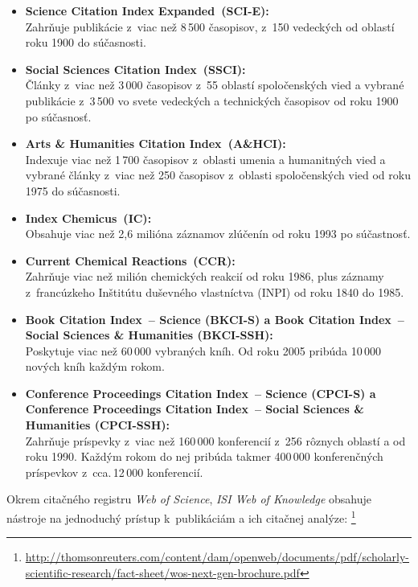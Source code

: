 \begin{itemize}
\item \textbf{Science Citation Index Expanded\R\ (SCI-E):}\\
  Zahrňuje publikácie z~viac než 8\,500 časopisov, z~150
  vedeckých od oblastí roku 1900 do súčasnosti.
\item \textbf{Social Sciences Citation Index\R\ (SSCI):}\\
  Články z~viac než 3\,000 časopisov z~55 oblastí spoločenských vied a vybrané
  publikácie z~3\,500 vo svete vedeckých a technických
  časopisov od roku 1900 po súčasnosť.
\item \textbf{Arts \& Humanities Citation Index\R\ (A\&HCI):}\\
  Indexuje viac než 1\,700 časopisov z~oblasti umenia a humanitných vied a
  vybrané články z~viac než 250 časopisov z~oblasti spoločenských vied od roku 1975
  do súčasnosti.
\item \textbf{Index Chemicus\R\ (IC):}\\
  Obsahuje viac než 2,6 milióna záznamov zlúčenín od roku 1993 po súčastnosť.
\item \textbf{Current Chemical Reactions\R\ (CCR):}\\
  Zahrňuje viac než milión chemických reakcií od roku 1986, plus záznamy
  z~francúzkeho Inštitútu duševného vlastníctva (INPI) od
  roku 1840 do 1985.
\item \textbf{Book Citation Index\R\ -- Science (BKCI-S) a Book Citation
  Index\R\ -- Social Sciences \& Humanities (BKCI-SSH):}\\
  Poskytuje viac než 60\,000 vybraných kníh.  Od roku 2005 pribúda 10\,000 nových kníh
  každým rokom.
\item \textbf{Conference Proceedings Citation Index\R\ -- Science (CPCI-S) a
  Conference Proceedings Citation Index\R\ -- Social Sciences \& Humanities
  (CPCI-SSH):}\\ Zahrňuje príspevky z~viac než 160\,000 konferencií z~256
  rôznych oblastí  a  od roku 1990.  Každým rokom do nej pribúda
  takmer 400\,000 konferenčných príspevkov z~cca.\,12\,000 konferencií.
\end{itemize}


Okrem citačného registru \emph{Web of Science}, \emph{ISI Web of Knowledge}
obsahuje nástroje na jednoduchý prístup k~publikáciám a ich citačnej
analýze: \footnote{\url{http://thomsonreuters.com/content/dam/openweb/documents/pdf/scholarly-scientific-research/fact-sheet/wos-next-gen-brochure.pdf}}


